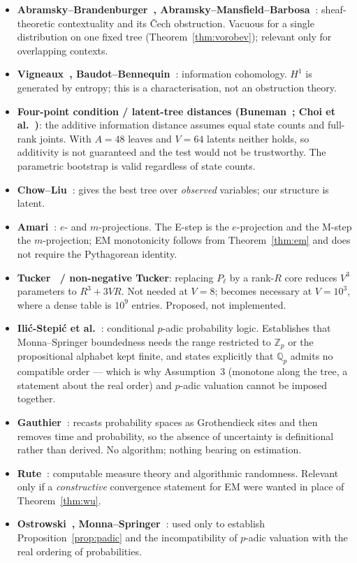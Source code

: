 \documentclass[11pt,a4paper]{article}
\theoremstyle{plain}
\theoremstyle{definition}
\begin{document}
\begin{itemize}
\item \textbf{Abramsky--Brandenburger~\cite{ab2011}, Abramsky--Mansfield--Barbosa~\cite{amb2011}}:
      sheaf-theoretic contextuality and its \v{C}ech obstruction. Vacuous for a
      single distribution on one fixed tree
      (Theorem~\ref{thm:vorobev}); relevant only for overlapping contexts.
\item \textbf{Vigneaux~\cite{vigneaux2019}, Baudot--Bennequin~\cite{bb2015}}:
      information cohomology. $H^1$ is generated by entropy; this is a
      characterisation, not an obstruction theory.
\item \textbf{Four-point condition / latent-tree distances
      (Buneman~\cite{buneman1971}; Choi et al.~\cite{choi2011})}: the additive
      information distance assumes equal state counts and full-rank joints.
      With $A=48$ leaves and $V=64$ latents neither holds, so additivity is not
      guaranteed and the test would not be trustworthy. The parametric
      bootstrap is valid regardless of state counts.
\item \textbf{Chow--Liu~\cite{chowliu1968}}: gives the best tree over
      \emph{observed} variables; our structure is latent.
\item \textbf{Amari~\cite{amari2016}}: $e$- and $m$-projections. The E-step is
      the $e$-projection and the M-step the $m$-projection; EM monotonicity
      follows from Theorem~\ref{thm:em} and does not require the Pythagorean
      identity.
\item \textbf{Tucker~\cite{tucker1966} / non-negative Tucker}: replacing
      $P_\ell$ by a rank-$R$ core reduces $V^3$ parameters to $R^3+3VR$. Not
      needed at $V=8$; becomes necessary at $V=10^3$, where a dense table is
      $10^9$ entries. Proposed, not implemented.
\item \textbf{Ili\'c-Stepi\'c et al.~\cite{ilic2014}}: conditional $p$-adic
      probability logic. Establishes that Monna--Springer boundedness needs the
      range restricted to $\mathbb{Z}_p$ or the propositional alphabet kept
      finite, and states explicitly that $\mathbb{Q}_p$ admits no compatible
      order --- which is why Assumption~3 (monotone along the tree, a statement
      about the real order) and $p$-adic valuation cannot be imposed together.
\item \textbf{Gauthier~\cite{gauthier2014}}: recasts probability spaces as
      Grothendieck sites and then removes time and probability, so the absence
      of uncertainty is definitional rather than derived. No algorithm; nothing
      bearing on estimation.
\item \textbf{Rute~\cite{rute2019}}: computable measure theory and algorithmic
      randomness. Relevant only if a \emph{constructive} convergence statement
      for EM were wanted in place of Theorem~\ref{thm:wu}.
\item \textbf{Ostrowski~\cite{ostrowski1916}, Monna--Springer~\cite{ms1963}}:
      used only to establish Proposition~\ref{prop:padic} and the
      incompatibility of $p$-adic valuation with the real ordering of
      probabilities.
\end{itemize}
\end{document}
